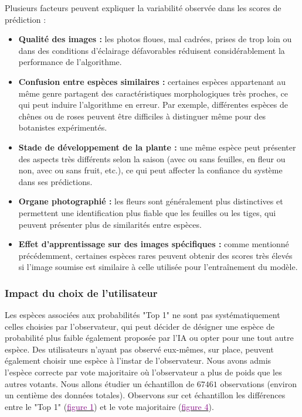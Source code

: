 \documentclass[a4paper,12pt]{article}
\begin{document}
Plusieurs facteurs peuvent expliquer la variabilité observée dans les scores de prédiction : 
\begin{itemize}
    \item \textbf{Qualité des images :} les photos floues, mal cadrées, prises de trop loin ou dans des conditions d'éclairage défavorables réduisent considérablement la performance de l'algorithme.
    \item \textbf{Confusion entre espèces similaires :} certaines espèces appartenant au même genre partagent des caractéristiques morphologiques très proches, ce qui peut induire l'algorithme en erreur. Par exemple, différentes espèces de chênes ou de roses peuvent être difficiles à distinguer même pour des botanistes expérimentés.
    \item \textbf{Stade de développement de la plante :} une même espèce peut présenter des aspects très différents selon la saison (avec ou sans feuilles, en fleur ou non, avec ou sans fruit, etc.), ce qui peut affecter la confiance du système dans ses prédictions.
    \item \textbf{Organe photographié :} les fleurs sont généralement plus distinctives et permettent une identification plus fiable que les feuilles ou les tiges, qui peuvent présenter plus de similarités entre espèces.
    \item \textbf{Effet d'apprentissage sur des images spécifiques :} comme mentionné précédemment, certaines espèces rares peuvent obtenir des scores très élevés si l'image soumise est similaire à celle utilisée pour l'entraînement du modèle.
\end{itemize}

\subsubsection{Impact du choix de l'utilisateur}

Les espèces associées aux probabilités "Top 1" ne sont pas systématiquement celles choisies par l'observateur, qui peut décider de désigner une espèce de probabilité plus faible également proposée par l'IA ou opter pour une tout autre espèce. Des utilisateurs n'ayant pas observé eux-mêmes, sur place, peuvent également choisir une espèce à l'instar de l'observateur. Nous avons admis l'espèce correcte par vote majoritaire où l'observateur a plus de poids que les autres votants. Nous allons étudier un échantillon de $\num{67 461}$ observations (environ un centième des données totales). Observons sur cet échantillon les différences entre le "Top 1" (\hyperref[fig1]{\textcolor{purple}{figure 1}}) et le vote majoritaire (\hyperref[fig4]{\textcolor{purple}{figure 4}}).
\end{document}
